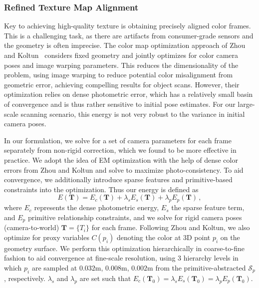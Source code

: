 \subsubsection{Refined Texture Map Alignment}
\label{subsec:3dlite-color-align}
Key to achieving high-quality texture is obtaining precisely aligned color frames.
This is a challenging task, as there are artifacts from consumer-grade sensors and the geometry is often imprecise.
The color map optimization approach of Zhou and Koltun~\cite{zhou2014color} considers fixed geometry and jointly optimizes for color camera poses and image warping parameters.
This reduces the dimensionality of the problem, using image warping to reduce potential color misalignment from geometric error, achieving compelling results for object scans.
However, their optimization relies on dense photometric error, which has a relatively small basin of convergence and is thus rather sensitive to initial pose estimates.
For our large-scale scanning scenario, this energy is not very robust to the variance in initial camera poses.

In our formulation, we solve for a set of camera parameters for each frame separately from non-rigid correction, which we found to be more effective in practice. 
We adopt the idea of EM optimization with the help of dense color errors from Zhou and Koltun and solve to maximize photo-consistency.
To aid convergence, we additionally introduce sparse features and primitive-based constraints into the optimization.
Thus our energy is defined as
$$ E(\mathbf{T})=E_c(\mathbf{T}) + \lambda_s E_s(\mathbf{T}) + \lambda_p E_p(\mathbf{T})\,, $$
where $E_c$ represents the dense photometric energy, $E_s$ the sparse feature term, and $E_p$ primitive relationship constraints, and we solve for rigid camera poses (camera-to-world) $\mathbf{T}=\{T_i\}$ for each frame.
Following Zhou and Koltun, we also optimize for proxy variables $C(p_i)$ denoting the color at 3D point $p_i$ on the geometry surface.
We perform this optimization hierarchically in coarse-to-fine fashion to aid convergence at fine-scale resolution, using 3 hierarchy levels in which $p_i$ are sampled at $0.032$m, $0.008$m, $0.002$m from the primitive-abstracted $\mathcal{S}_p$, respectively.
$\lambda_s$ and $\lambda_p$ are set such that $E_c(\mathbf{T}_0)=\lambda_s E_s(\mathbf{T}_0) = \lambda_p E_p(\mathbf{T}_0)$.

